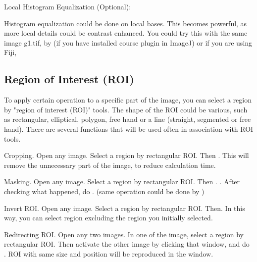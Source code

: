\begin{indentexercise}{3}
Local Histogram Equalization (Optional):
\item Histogram equalization could be done on local bases. This becomes
powerful, as more local details could be contrast enhanced. You could
try this with the same image g1.tif, by  
(if you have installed course plugin in ImageJ) or if you are using Fiji, 
\end{indentexercise}



\subsection{Region of Interest (ROI) }
\label{subsec:roi}
To apply certain operation to a specific part of the image, you can
select a region by "region of interest
(ROI)" tools. The shape of the ROI could be various,
such as rectangular, elliptical, polygon, free hand or a line
(straight, segmented or free hand). There are several functions that
will be used often in association with ROI tools. 

\begin{indentexercise}{1}
Cropping. Open any image. Select a region by
rectangular ROI. Then . This will
remove the unnecessary part of the image, to reduce calculation time.
\end{indentexercise}

\begin{indentexercise}{2}
Masking. Open any image. Select a region by
rectangular ROI. Then .
. After checking what
happened, do . (same operation could
be done by )
\end{indentexercise}

\begin{indentexercise}{3}
Invert ROI. Open any image. Select a region by
rectangular ROI. Then. In this way, you can select region
excluding the region you initially selected.
\end{indentexercise}

\begin{indentexercise}{4}
Redirecting ROI. Open any two images. In one
of the image, select a region by rectangular ROI. Then activate the
other image by clicking that window, and do . ROI with
same size and position will be reproduced in the window. 
\end{indentexercise}



